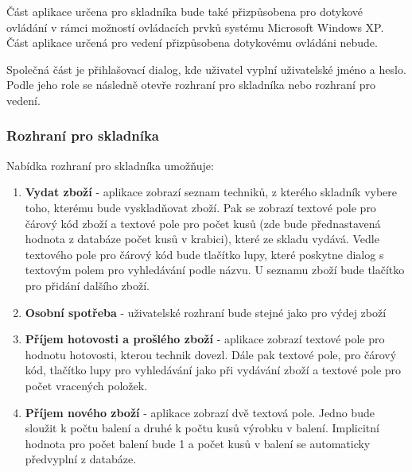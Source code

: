 \documentclass[a4paper,10pt]{article}
\begin{document}
Část aplikace určena pro skladníka bude také přizpůsobena pro dotykové ovládání v rámci možností ovládacích prvků systému Microsoft Windows XP. Část aplikace určená pro vedení přizpůsobena dotykovému ovládáni nebude.

Společná část je přihlašovací dialog, kde uživatel vyplní uživatelské jméno a heslo. Podle jeho role se následně otevře rozhraní pro skladníka nebo rozhraní pro vedení.

\subsubsection{Rozhraní pro skladníka}
Nabídka rozhraní pro skladníka umožňuje:
\begin{enumerate}
	\item \textbf{Vydat zboží} - aplikace zobrazí seznam techniků, z kterého skladník vybere toho, kterému bude vyskladňovat zboží. Pak se zobrazí textové pole pro čárový kód zboží a textové pole pro počet kusů (zde bude přednastavená hodnota z databáze počet kusů v krabici), které ze skladu vydává. Vedle textového pole pro čárový kód bude tlačítko lupy, které poskytne dialog s textovým polem pro vyhledávání podle názvu. U seznamu zboží bude tlačítko pro přidání dalšího zboží.
	\item \textbf{Osobní spotřeba} - uživatelské rozhraní bude stejné jako pro výdej zboží
	\item \textbf{Příjem hotovosti a prošlého zboží} - aplikace zobrazí textové pole pro hodnotu hotovosti, kterou technik dovezl. Dále pak textové pole, pro čárový kód, tlačítko lupy pro vyhledávání jako při vydávání zboží a textové pole pro počet vracených položek.
	\item \textbf{Příjem nového zboží} - aplikace zobrazí dvě textová pole. Jedno bude sloužit k počtu balení a druhé k počtu kusů výrobku v balení. Implicitní hodnota pro počet balení bude 1 a počet kusů v balení se automaticky předvyplní z databáze.
\end{enumerate}
\end{document}
